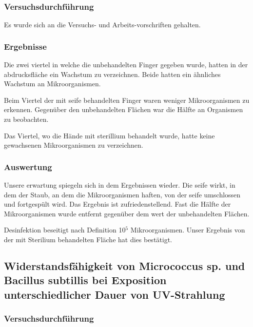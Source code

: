 \subsubsection{Versuchsdurchführung}
\label{sec:Exp-Des-V}

Es wurde sich an die Versuchs- und Arbeits-vorschriften gehalten.

\subsubsection{Ergebnisse}
\label{sec:Exp-Des-E}
Die zwei viertel in welche die unbehandelten Finger gegeben wurde, hatten in der abdrucksfläche ein Wachstum zu verzeichnen.
Beide hatten ein ähnliches Wachstum an Mikroorganismen.

Beim Viertel der mit seife behandelten Finger waren weniger Mikroorganismen zu erkennen.
Gegenüber den unbehandelten Flächen war die Hälfte an Organismen zu 
beobachten.

Das Viertel, wo die Hände mit sterillium behandelt wurde, hatte keine gewachsenen Mikroorganismen zu verzeichnen.


\subsubsection{Auswertung}
\label{sec:Exp-Des-A}

Unsere erwartung spiegeln sich in dem Ergebnissen wieder.
Die seife wirkt, in dem der Staub, an dem die Mikroorganismen haften, von der seife umschlossen und fortgespült wird.
Das Ergebnis ist zufriedenstellend.
Fast die Hälfte der Mikroorganismen wurde entfernt gegenüber dem wert der unbehandelten Flächen.

Desinfektion beseitigt nach Definition 10$^5$ Mikroorganismen.
Unser Ergebnis von der mit Sterilium behandelten Fläche hat dies bestätigt.

\subsection{Widerstandsfähigkeit von Micrococcus sp. und Bacillus subtillis bei Exposition unterschiedlicher Dauer von UV-Strahlung}
\label{sec:Exp-UV}

\subsubsection{Versuchsdurchführung}
\label{sec:Exp-UV-V}

